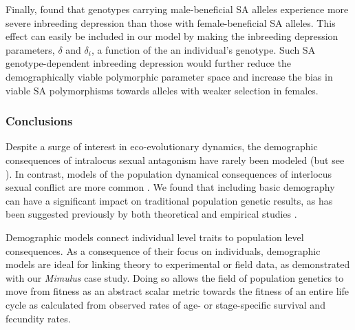 \documentclass[11pt]{article}
\begin{document}

Finally, \cite{grieshop2017male} found that genotypes carrying male-beneficial SA alleles experience more severe inbreeding depression than those with female-beneficial SA alleles. This effect can easily be included in our model by making the inbreeding depression parameters, $\delta$ and $\delta_i$, a function of the an individual's genotype. Such SA genotype-dependent inbreeding depression would further reduce the demographically viable polymorphic parameter space and increase the bias in viable SA polymorphisms towards alleles with weaker selection in females.


\subsubsection*{Conclusions} 

Despite a surge of interest in eco-evolutionary dynamics, the demographic consequences of intralocus sexual antagonism have rarely been modeled (but see \citealt{harts2014demography,kokko2003sexy, MatthewsConnallon2019}). In contrast, models of the population dynamical consequences of interlocus sexual conflict are more common \citep[e.g.,][]{tanaka1996sexual, martinez2017sexual}. We found that including basic demography can have a significant impact on traditional population genetic results, as has been suggested previously by both theoretical and empirical studies \citep{kokko2003sexy, berger2016intralocus, grieshop2017male}. 

Demographic models connect individual level traits to population level consequences. As a consequence of their focus on individuals, demographic models are ideal for linking theory to experimental or field data, as demonstrated with our \textit{Mimulus} case study. Doing so allows the field of population genetics to move from fitness as an abstract scalar metric towards the fitness of an entire life cycle as calculated from observed rates of age- or stage-specific survival and fecundity rates.  



 
\end{document}
